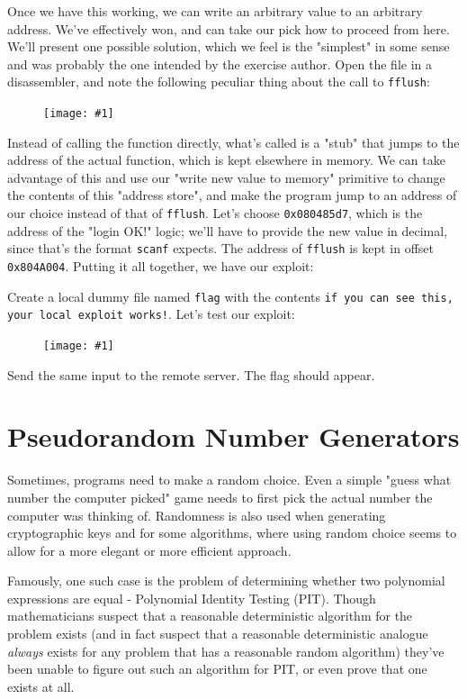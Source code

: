 \documentclass{article}
\newcommand{\displayimage}[1] {
\begin{figure}[H]
    \centering
    \texttt{[image: \#1]} 
\end{figure}
}
\newcommand{\xcode}[2]{\colorbox{ubuntuback}{\lstinline[language=#1]|#2|}}
\newcommand{\code}[1]{\colorbox{ubuntuback}{\texttt{#1}}}
\begin{document}
Once we have this working, we can write an arbitrary value to an arbitrary address. We've effectively won, and can take our pick how to proceed from here. We'll present one possible solution, which we feel is the "simplest" in some sense and was probably the one intended by the exercise author. Open the file in a disassembler, and note the following peculiar thing about the call to \xcode{C}{fflush}:

\displayimage{./exercises/04_passcode/fflush.png}

Instead of calling the function directly, what's called is a "stub" that jumps to the address of the actual function, which is kept elsewhere in memory. We can take advantage of this and use our "write new value to memory" primitive to change the contents of this "address store", and make the program jump to an address of our choice instead of that of \xcode{C}{fflush}. Let's choose \code{0x080485d7}, which is the address of the "login OK!" logic; we'll have to provide the new value in decimal, since that's the format \xcode{C}{scanf} expects. The address of \xcode{C}{fflush} is kept in offset \code{0x804A004}. Putting it all together, we have our exploit:



Create a local dummy file named \code{flag} with the contents \code{if you can see this, your local exploit works!}. Let's test our exploit:

\displayimage{./exercises/04_passcode/success.png}

Send the same input to the remote server. The flag should appear.

\section{Pseudorandom Number Generators}

Sometimes, programs need to make a random choice. Even a simple "guess what number the computer picked" game needs to first pick the actual number the computer was thinking of. Randomness is also used when generating cryptographic keys and for some algorithms, where using random choice seems to allow for a more elegant or more efficient approach.

Famously, one such case is the problem of determining whether two polynomial expressions are equal - Polynomial Identity Testing (PIT). Though mathematicians suspect that a reasonable deterministic algorithm for the problem exists (and in fact suspect that a reasonable deterministic analogue \textit{always} exists for any problem that has a reasonable random algorithm) they've been unable to figure out such an algorithm for PIT, or even prove that one exists at all.
\end{document}
